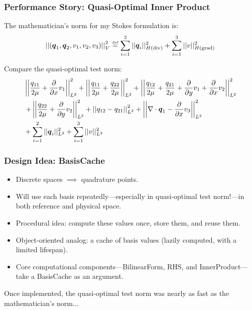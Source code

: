 \documentclass[mathserif]{beamer}
\newcommand{\NVRvect}[1]{\ensuremath\boldsymbol{#1}}
\newcommand{\NVRnorm}[1]{\left|\left|#1\right|\right|}
\newcommand{\NVRgrad}{\nabla}
\newcommand{\NVRdiv}{\NVRgrad \cdot}
\newcommand{\NVRpd}[2]{\frac{\partial#1}{\partial#2}}
\newcommand{\NVReqdef}{\stackrel{\text{\tiny def}}{=}}
\newcommand{\NVRHgrad}{H(\text{grad})}
\newcommand{\NVRHdiv}{H(\text{div})}
\newcommand{\NVRsumm}[2]{\ensuremath\displaystyle\sum\limits_{#1}^{#2}}
\begin{document}
\begin{frame}
\frametitle{Performance Story: Quasi-Optimal Inner Product}

The mathematician's norm for my Stokes formulation is:
\begin{align*}
\NVRnorm{(\NVRvect{q}_{1},\NVRvect{q}_{2},v_{1},v_{2},v_{3})}_{V}^{2}  \NVReqdef \NVRsumm{i=1}{2} ||\NVRvect{q}_{i}||_{\NVRHdiv}^{2} + \NVRsumm{i=1}{3} ||v||_{\NVRHgrad}^{2} \label{NVR:eq:genericNorm}\\
\end{align*}

Compare the quasi-optimal test norm:
\begin{align*}
& \NVRnorm{\frac{q_{11}}{2\mu}+\NVRpd{}{x}v_{1}}_{L^2}^{2} + \NVRnorm{\frac{q_{11}}{2\mu}+\frac{q_{22}}{2\mu}}_{L^2}^{2} + \NVRnorm{\frac{q_{12}}{2\mu}+\frac{q_{21}}{2\mu}+\NVRpd{}{y}v_{1}+\NVRpd{}{x}v_{2}}_{L^2}^{2}\\
&\left. + \NVRnorm{\frac{q_{22}}{2\mu}+\NVRpd{}{y}v_{2}}_{L^2}^{2} + \NVRnorm{q_{12}-q_{21}}_{L^2}^{2} + \NVRnorm{\NVRdiv \NVRvect{q}_{1}-\NVRpd{}{x}v_{3}}_{L^2}^{2} \right.\\
&+\NVRsumm{i=1}{2} ||\NVRvect{q}_{i}||_{L^{2}}^{2} + \NVRsumm{i=1}{3} ||v||_{L^{2}}^{2}\\
\end{align*}

\end{frame}


\begin{frame}
\frametitle{Design Idea: BasisCache}

\begin{itemize}
\item Discrete spaces $\implies$ quadrature points.
\item Will use each basis repeatedly---especially in quasi-optimal test norm!---in both reference and physical space.
\end{itemize}

\begin{itemize}
\item Procedural idea: compute these values once, store them, and reuse them.
\item Object-oriented analog: a cache of basis values (lazily computed, with a limited lifespan).
\item Core computational components---BilinearForm, RHS, and InnerProduct---take a BasisCache as an argument.
\end{itemize}

Once implemented, the quasi-optimal test norm was nearly as fast as the mathematician's norm...

\end{frame}
\end{document}
